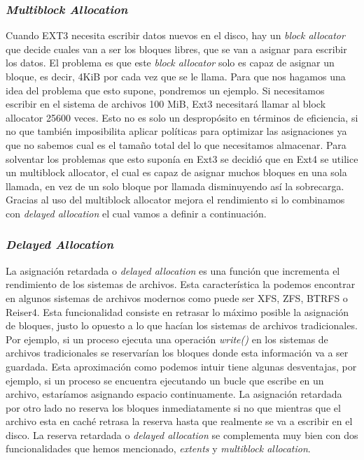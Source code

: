 \subsubsection{\textit{Multiblock Allocation}}
Cuando EXT3 necesita escribir datos nuevos en el disco, hay un \textit{block allocator} que decide cuales van a ser los bloques libres, que se van a asignar para escribir los datos. El problema es que este \textit{block allocator} solo es capaz de asignar un bloque, es decir, 4KiB por cada vez que se le llama. Para que nos hagamos una idea del problema que esto supone, pondremos un ejemplo. Si necesitamos escribir en el sistema de archivos 100 MiB, Ext3 necesitará llamar al block allocator 25600 veces. Esto no es solo un despropósito en términos de eficiencia, si no que también imposibilita aplicar políticas para optimizar las asignaciones ya que no sabemos cual es el tamaño total del lo que necesitamos almacenar. Para solventar los problemas que esto suponía en Ext3 se decidió que en Ext4 se utilice un multiblock allocator, el cual es capaz de asignar muchos bloques en una sola llamada, en vez de un solo bloque por llamada disminuyendo así la sobrecarga. Gracias al uso del multiblock allocator mejora el rendimiento si lo combinamos con \textit{delayed allocation} el cual vamos a definir a continuación. \cite{ext4howto} \\


\subsubsection{\textit{Delayed Allocation}}
La asignación retardada o \textit{delayed allocation} es una función que incrementa el rendimiento de los sistemas de archivos. Esta característica la podemos encontrar en algunos sistemas de archivos modernos como puede ser XFS, ZFS, BTRFS o Reiser4. Esta funcionalidad consiste en retrasar lo máximo posible la asignación de bloques, justo lo opuesto a lo que hacían los sistemas de archivos tradicionales. Por ejemplo, si un proceso ejecuta una operación \textit{write()} en los sistemas de archivos tradicionales se reservarían los bloques donde esta información va a ser guardada. Esta aproximación como podemos intuir tiene algunas desventajas, por ejemplo, si un proceso se encuentra ejecutando un bucle que escribe en un archivo, estaríamos asignando espacio continuamente. La asignación retardada por otro lado no reserva los bloques inmediatamente si no que mientras que el archivo esta en caché retrasa la reserva hasta que realmente se va a escribir en el disco. 
La reserva retardada o \textit{delayed allocation} se complementa muy bien con dos funcionalidades que hemos mencionado, \textit{extents} y \textit{multiblock allocation}. \cite{ext4howto}




